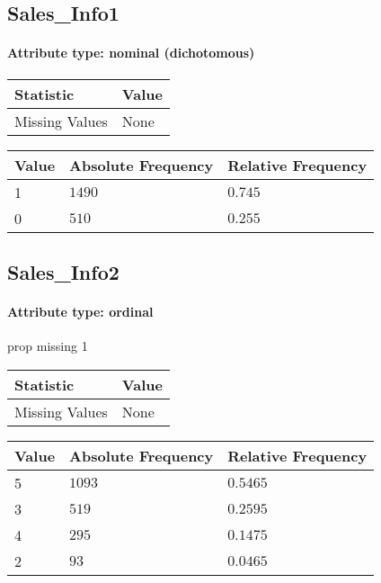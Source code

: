 \subsection{Sales\_Info1}
\paragraph{Attribute type: nominal (dichotomous)}
\qquad
\begin{table}[H]
	\renewcommand{\arraystretch}{1.25}
	\begin{tabular}{l|l}
		\textbf{Statistic} & \textbf{Value}\\\hline
		Missing Values& None\\\hline
	\end{tabular}
\end{table}
\begin{table}[H]
	\renewcommand{\arraystretch}{1.25}
	\begin{tabular}{l|l|l}
		\textbf{Value} & \textbf{Absolute Frequency} & \textbf{Relative Frequency}\\\hline
		1&$1490$&$0.745$\\\hline
		0&$510$&$0.255$
	\end{tabular}
\end{table}

\subsection{Sales\_Info2}
\paragraph{Attribute type: ordinal} prop missing 1
\qquad
\begin{table}[H]
	\renewcommand{\arraystretch}{1.25}
	\begin{tabular}{l|l}
		\textbf{Statistic} & \textbf{Value}\\\hline
		Missing Values& None\\\hline
	\end{tabular}
\end{table}
\begin{table}[H]
	\renewcommand{\arraystretch}{1.25}
	\begin{tabular}{l|l|l}
		\textbf{Value} & \textbf{Absolute Frequency} & \textbf{Relative Frequency}\\\hline
		5&$1093$&$0.5465$\\\hline
		3&$519$&$0.2595$\\\hline
		4&$295$&$0.1475$\\\hline
		2&$93$&$0.0465$
	\end{tabular}
\end{table}

